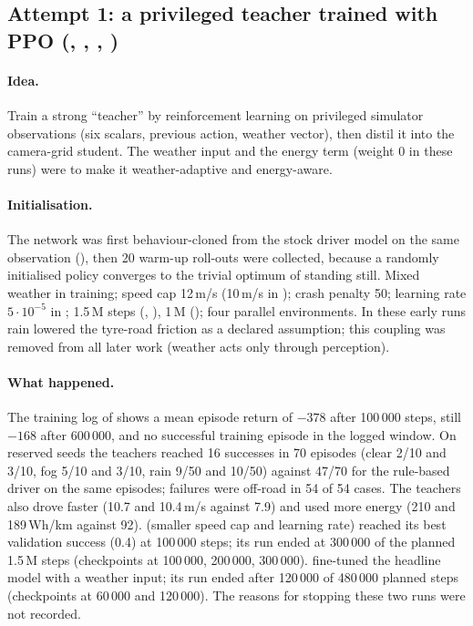 \subsection{Attempt 1: a privileged teacher trained with PPO (, , , )}
\paragraph{Idea.} Train a strong ``teacher'' by reinforcement learning on privileged simulator observations (six scalars, previous action, weather vector), then distil it into the camera-grid student. The weather input and the energy term (weight 0 in these runs) were to make it weather-adaptive and energy-aware.
\paragraph{Initialisation.} The network was first behaviour-cloned from the stock driver model on the same observation (), then 20 warm-up roll-outs were collected, because a randomly initialised policy converges to the trivial optimum of standing still. Mixed weather in training; speed cap 12\,m/s (10\,m/s in ); crash penalty 50; learning rate $5\cdot10^{-5}$ in ; 1.5\,M steps (, ), 1\,M (); four parallel environments.
In these early runs rain lowered the tyre-road friction as a declared assumption; this coupling was removed from all later work (weather acts only through perception).
\paragraph{What happened.} The training log of  shows a mean episode return of $-378$ after 100\,000 steps, still $-168$ after 600\,000, and no successful training episode in the logged window. On reserved seeds the teachers reached 16 successes in 70 episodes (clear 2/10 and 3/10, fog 5/10 and 3/10, rain 9/50 and 10/50) against 47/70 for the rule-based driver on the same episodes; failures were off-road in 54 of 54 cases.
The teachers also drove faster (10.7 and 10.4\,m/s against 7.9) and used more energy (210 and 189\,Wh/km against 92).  (smaller speed cap and learning rate) reached its best validation success (0.4) at 100\,000 steps; its run ended at 300\,000 of the planned 1.5\,M steps (checkpoints at 100\,000, 200\,000, 300\,000).  fine-tuned the headline model with a weather input; its run ended after 120\,000 of 480\,000 planned steps (checkpoints at 60\,000 and 120\,000). The reasons for stopping these two runs were not recorded.
